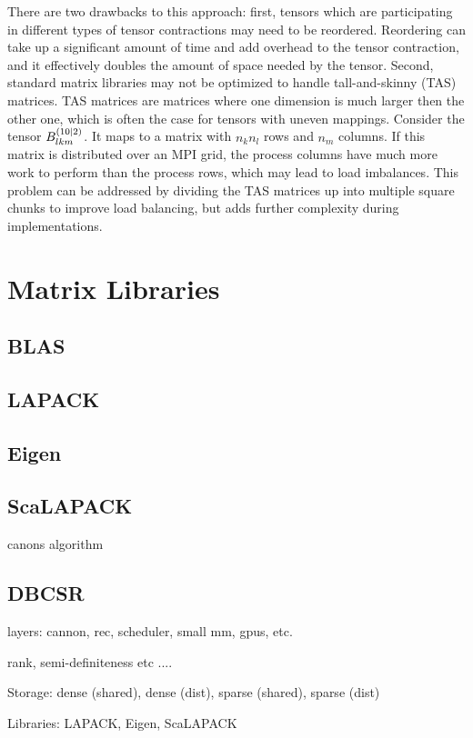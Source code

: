 There are two drawbacks to this approach: first, tensors which are participating in different types of tensor contractions may need to be reordered. Reordering can take up a significant amount of time and add overhead to the tensor contraction, and it effectively doubles the amount of space needed by the tensor. Second, standard matrix libraries may not be optimized to handle tall-and-skinny (TAS) matrices. TAS matrices are matrices where one dimension is much larger then the other one, which is often the case for tensors with uneven mappings. Consider the tensor  $B_{lkm}^{\left( 10 \mid 2 \right)}$. It maps to a matrix with $n_kn_l$ rows and $n_m$ columns. If this matrix is distributed over an MPI grid, the process columns have much more work to perform than the process rows, which may lead to load imbalances. This problem can be addressed by dividing the TAS matrices up into multiple square chunks to improve load balancing, but adds further complexity during implementations.

\section{Matrix Libraries}

\subsection{BLAS}

\subsection{LAPACK}

\subsection{Eigen}

\subsection{ScaLAPACK}

canons algorithm

\subsection{DBCSR}

layers: cannon, rec, scheduler, small mm, gpus, etc.

rank, semi-definiteness etc ....

Storage: dense (shared), dense (dist), sparse (shared), sparse (dist)

Libraries: LAPACK, Eigen, ScaLAPACK